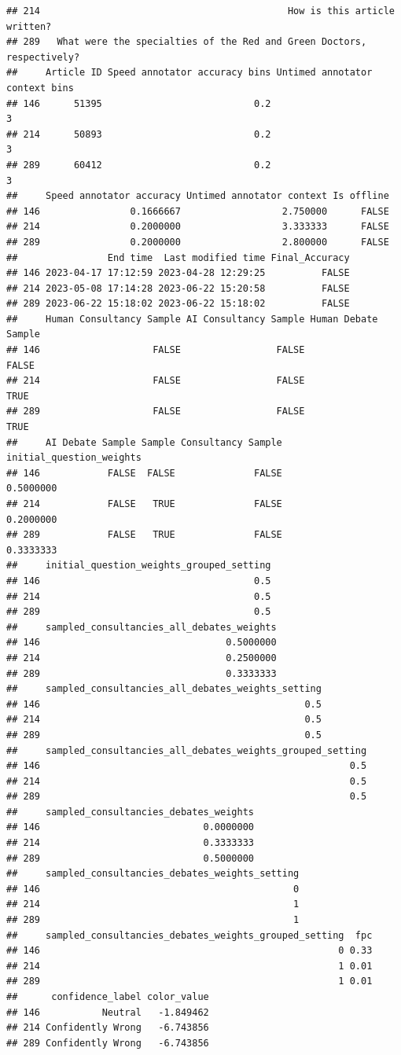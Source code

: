 \documentclass[
]{article}
\begin{document}
\begin{verbatim}
## 214                                            How is this article written?
## 289   What were the specialties of the Red and Green Doctors, respectively?
##     Article ID Speed annotator accuracy bins Untimed annotator context bins
## 146      51395                           0.2                              3
## 214      50893                           0.2                              3
## 289      60412                           0.2                              3
##     Speed annotator accuracy Untimed annotator context Is offline
## 146                0.1666667                  2.750000      FALSE
## 214                0.2000000                  3.333333      FALSE
## 289                0.2000000                  2.800000      FALSE
##                End time  Last modified time Final_Accuracy
## 146 2023-04-17 17:12:59 2023-04-28 12:29:25          FALSE
## 214 2023-05-08 17:14:28 2023-06-22 15:20:58          FALSE
## 289 2023-06-22 15:18:02 2023-06-22 15:18:02          FALSE
##     Human Consultancy Sample AI Consultancy Sample Human Debate Sample
## 146                    FALSE                 FALSE               FALSE
## 214                    FALSE                 FALSE                TRUE
## 289                    FALSE                 FALSE                TRUE
##     AI Debate Sample Sample Consultancy Sample initial_question_weights
## 146            FALSE  FALSE              FALSE                0.5000000
## 214            FALSE   TRUE              FALSE                0.2000000
## 289            FALSE   TRUE              FALSE                0.3333333
##     initial_question_weights_grouped_setting
## 146                                      0.5
## 214                                      0.5
## 289                                      0.5
##     sampled_consultancies_all_debates_weights
## 146                                 0.5000000
## 214                                 0.2500000
## 289                                 0.3333333
##     sampled_consultancies_all_debates_weights_setting
## 146                                               0.5
## 214                                               0.5
## 289                                               0.5
##     sampled_consultancies_all_debates_weights_grouped_setting
## 146                                                       0.5
## 214                                                       0.5
## 289                                                       0.5
##     sampled_consultancies_debates_weights
## 146                             0.0000000
## 214                             0.3333333
## 289                             0.5000000
##     sampled_consultancies_debates_weights_setting
## 146                                             0
## 214                                             1
## 289                                             1
##     sampled_consultancies_debates_weights_grouped_setting  fpc
## 146                                                     0 0.33
## 214                                                     1 0.01
## 289                                                     1 0.01
##      confidence_label color_value
## 146           Neutral   -1.849462
## 214 Confidently Wrong   -6.743856
## 289 Confidently Wrong   -6.743856
\end{verbatim}
\end{document}

